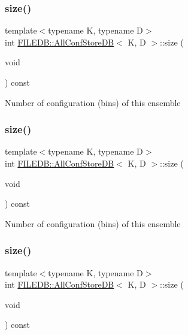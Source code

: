 \subsubsection{\texorpdfstring{size()}{size()}\hspace{0.1cm}{\footnotesize\ttfamily [1/3]}}
{\footnotesize\ttfamily template$<$typename K, typename D$>$ \\
int \mbox{\hyperlink{classFILEDB_1_1AllConfStoreDB}{F\+I\+L\+E\+D\+B\+::\+All\+Conf\+Store\+DB}}$<$ K, D $>$\+::size (\begin{DoxyParamCaption}\item[{void}]{ }\end{DoxyParamCaption}) const\hspace{0.3cm}{\ttfamily [inline]}}

Number of configuration (bins) of this ensemble \mbox{\label{classFILEDB_1_1AllConfStoreDB_a78dd830c5211b3b00b8eae6170ffc9d6}} 
\subsubsection{\texorpdfstring{size()}{size()}\hspace{0.1cm}{\footnotesize\ttfamily [2/3]}}
{\footnotesize\ttfamily template$<$typename K, typename D$>$ \\
int \mbox{\hyperlink{classFILEDB_1_1AllConfStoreDB}{F\+I\+L\+E\+D\+B\+::\+All\+Conf\+Store\+DB}}$<$ K, D $>$\+::size (\begin{DoxyParamCaption}\item[{void}]{ }\end{DoxyParamCaption}) const\hspace{0.3cm}{\ttfamily [inline]}}

Number of configuration (bins) of this ensemble \mbox{\label{classFILEDB_1_1AllConfStoreDB_a78dd830c5211b3b00b8eae6170ffc9d6}} 
\subsubsection{\texorpdfstring{size()}{size()}\hspace{0.1cm}{\footnotesize\ttfamily [3/3]}}
{\footnotesize\ttfamily template$<$typename K, typename D$>$ \\
int \mbox{\hyperlink{classFILEDB_1_1AllConfStoreDB}{F\+I\+L\+E\+D\+B\+::\+All\+Conf\+Store\+DB}}$<$ K, D $>$\+::size (\begin{DoxyParamCaption}\item[{void}]{ }\end{DoxyParamCaption}) const\hspace{0.3cm}{\ttfamily [inline]}}

